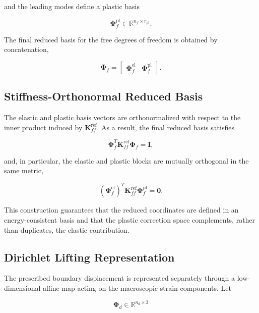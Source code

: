 \documentclass[11pt,a4paper]{article}
\begin{document}
and the leading modes define a plastic basis

\begin{equation}
\mathbf{\Phi}_{f}^{\mathrm{pl}} \in \mathbb{R}^{n_f \times r_{\mathrm{pl}}}.
\end{equation}

The final reduced basis for the free degrees of freedom is obtained by concatenation,

\begin{equation}
\mathbf{\Phi}_f
=
\begin{bmatrix}
\mathbf{\Phi}_{f}^{\mathrm{el}} &
\mathbf{\Phi}_{f}^{\mathrm{pl}}
\end{bmatrix}.
\end{equation}

\subsection{Stiffness-Orthonormal Reduced Basis}

The elastic and plastic basis vectors are orthonormalized with respect to the inner product induced by $\mathbf{K}_{ff}^{\mathrm{ref}}$. As a result, the final reduced basis satisfies

\begin{equation}
\mathbf{\Phi}_f^{T}\mathbf{K}_{ff}^{\mathrm{ref}}\mathbf{\Phi}_f
=
\mathbf{I},
\end{equation}

and, in particular, the elastic and plastic blocks are mutually orthogonal in the same metric,

\begin{equation}
\left(\mathbf{\Phi}_{f}^{\mathrm{el}}\right)^T
\mathbf{K}_{ff}^{\mathrm{ref}}
\mathbf{\Phi}_{f}^{\mathrm{pl}}
=
\mathbf{0}.
\end{equation}

This construction guarantees that the reduced coordinates are defined in an energy-consistent basis and that the plastic correction space complements, rather than duplicates, the elastic contribution.

\subsection{Dirichlet Lifting Representation}

The prescribed boundary displacement is represented separately through a low-dimensional affine map acting on the macroscopic strain components. Let

\begin{equation}
\mathbf{\Phi}_d \in \mathbb{R}^{n_d \times 3}
\end{equation}
\end{document}
